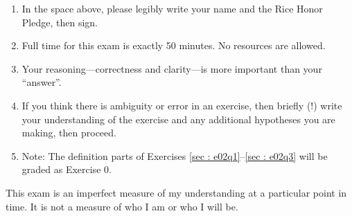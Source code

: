 \begin{enumerate}
\item In the space above, please legibly write your name and the Rice Honor Pledge, then sign.
\item Full time for this exam is exactly 50 minutes. No resources are allowed.
\item Your reasoning---correctness and clarity---is more important than your ``answer''.
\item If you think there is ambiguity or error in an exercise, then briefly (!) write your understanding of the exercise and any additional hypotheses you are making, then proceed.
\item Note: The definition parts of Exercises \ref{sec : e02q1}--\ref{sec : e02q3} will be graded as Exercise 0.
\end{enumerate}
This exam is an imperfect measure of my understanding at a particular point in time. It is not a measure of who I am or who I will be.